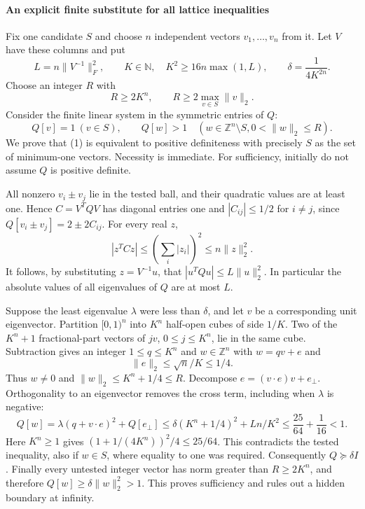 \documentclass[11pt]{article}
\begin{document}
\paragraph{An explicit finite substitute for all lattice inequalities}
Fix one candidate $S$ and choose $n$ independent vectors $v_1,\ldots,v_n$ from it. Let $V$ have these columns and put
\[
 L=n\lVert V^{-1}\rVert_F^2,\qquad
 K\in\mathbb N,\quad K^2\geq16n\max(1,L),\qquad
 \delta=\frac1{4K^{2n}}.
\]
Choose an integer $R$ with
\[
 R\geq2K^n,\qquad R\geq2\max_{v\in S}\lVert v\rVert_2.
\]
Consider the finite linear system in the symmetric entries of $Q$:
\[
 Q[v]=1\ (v\in S),\qquad
 Q[w]>1\quad(w\in\mathbb Z^n\setminus S, 0<\lVert w\rVert_2\leq R).
 \tag{1}
\]
We prove that (1) is equivalent to positive definiteness with precisely $S$ as the set of minimum-one vectors. Necessity is immediate. For sufficiency, initially do not assume $Q$ is positive definite.

All nonzero $v_i\pm v_j$ lie in the tested ball, and their quadratic values are at least one. Hence $C=V^TQV$ has diagonal entries one and $|C_{ij}|\leq1/2$ for $i\ne j$, since $Q[v_i\pm v_j]=2\pm2C_{ij}$. For every real $z$,
\[
 |z^TCz|\leq\left(\sum_i|z_i|\right)^2\leq n\lVert z\rVert_2^2.
\]
It follows, by substituting $z=V^{-1}u$, that $|u^TQu|\leq L\lVert u\rVert_2^2$. In particular the absolute values of all eigenvalues of $Q$ are at most $L$.

Suppose the least eigenvalue $\lambda$ were less than $\delta$, and let $v$ be a corresponding unit eigenvector. Partition $[0,1)^n$ into $K^n$ half-open cubes of side $1/K$. Two of the $K^n+1$ fractional-part vectors of $jv$, $0\leq j\leq K^n$, lie in the same cube. Subtraction gives an integer $1\leq q\leq K^n$ and $w\in\mathbb Z^n$ with $w=qv+e$ and
\[
 \lVert e\rVert_2\leq\sqrt n/K\leq1/4.
\]
Thus $w\ne0$ and $\lVert w\rVert_2\leq K^n+1/4\leq R$. Decompose $e=(v\cdot e)v+e_\perp$. Orthogonality to an eigenvector removes the cross term, including when $\lambda$ is negative:
\[
 Q[w]=\lambda(q+v\cdot e)^2+Q[e_\perp]
 \leq\delta(K^n+1/4)^2+Ln/K^2
 \leq\frac{25}{64}+\frac1{16}<1.
\]
Here $K^n\geq1$ gives $(1+1/(4K^n))^2/4\leq25/64$. This contradicts the tested inequality, also if $w\in S$, where equality to one was required. Consequently $Q\succeq\delta I$. Finally every untested integer vector has norm greater than $R\geq2K^n$, and therefore $Q[w]\geq\delta\lVert w\rVert_2^2>1$. This proves sufficiency and rules out a hidden boundary at infinity.
\end{document}
